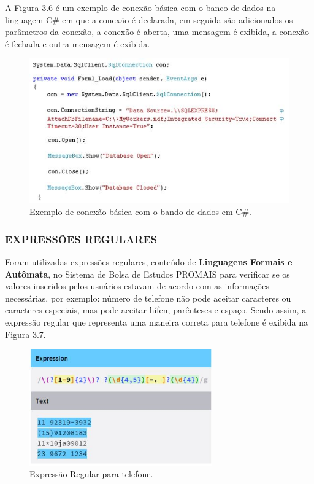 \documentclass[
  12pt,				%
  openany,
  oneside,
  a4paper,			%
  english,			%
  brazil
]{article}
\numberwithin{figure}{section}
\numberwithin{table}{section}
\begin{document}
A Figura 3.6 é um exemplo de conexão básica com o banco de dados na linguagem C\#
em que a conexão é declarada, em seguida são adicionados os parâmetros da conexão, a conexão é aberta, uma mensagem é exibida, a conexão é fechada e outra mensagem é exibida.

\begin{figure}[!htb]
\centering
\includegraphics[width=1\textwidth]{figura36}
\caption{Exemplo de conexão básica com o bando de dados em C\#.}
\end{figure}



\subsubsection{EXPRESSÕES REGULARES}

Foram utilizadas expressões regulares, conteúdo de \textbf{Linguagens Formais e Autômata},
no Sistema de Bolsa de Estudos PROMAIS para verificar se os valores inseridos pelos usuários estavam de acordo com as informações necessárias, por exemplo: número de telefone não pode aceitar caracteres ou caracteres especiais, mas pode aceitar hífen, parênteses e espaço. Sendo assim, a expressão regular que representa uma maneira correta para telefone é exibida na Figura 3.7.

\begin{figure}[!htb]
\centering
\includegraphics[width=0.7\textwidth]{figura37}
\caption{Expressão Regular para telefone.}
\end{figure}
\end{document}
